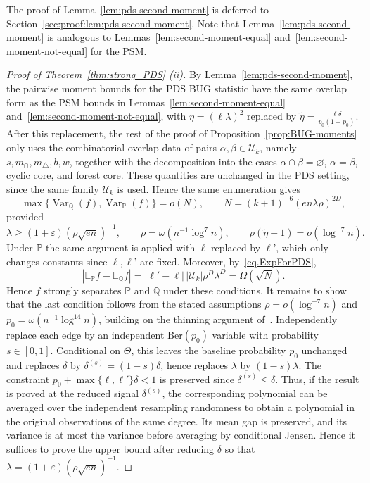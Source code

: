 \documentclass[11pt, letterpaper]{article}
\numberwithin{equation}{section}
\newcommand{\E}{\mathbb{E}}
\newcommand{\PP}{\mathbb{P}}
\newcommand{\QQ}{\mathbb{Q}}
\begin{document}
The proof of Lemma~\ref{lem:pds-second-moment} is deferred to Section~\ref{sec:proof:lem:pds-second-moment}.  Note that Lemma~\ref{lem:pds-second-moment} is analogous to Lemmas~\ref{lem:second-moment-equal} and~\ref{lem:second-moment-not-equal} for the PSM.

\begin{proof}[Proof of Theorem~\ref{thm:strong_PDS} \textnormal{(ii)}]
By Lemma~\ref{lem:pds-second-moment}, the pairwise moment bounds for the PDS BUG statistic have the same overlap form as the PSM bounds in Lemmas~\ref{lem:second-moment-equal} and~\ref{lem:second-moment-not-equal}, with $\eta=(\ell\lambda)^2$
replaced by $\tilde\eta=\frac{\ell\delta}{p_0(1-p_0)}.$ After this replacement, the rest of the proof of Proposition~\ref{prop:BUG-moments} only uses the combinatorial overlap data of pairs $\alpha,\beta\in\mathcal U_k$, namely $s,m_\cap,m_\triangle,b,w$, together with the decomposition into the cases $\alpha\cap\beta=\varnothing$, $\alpha=\beta$, cyclic core, and forest core. These quantities are unchanged in the PDS setting, since the same family $\mathcal U_k$ is used. Hence the same enumeration gives
\[
\max\{\operatorname{Var}_{\QQ}(f),\operatorname{Var}_{\PP}(f)\}=o(N),
\qquad
N=(k+1)^{-6}(en\lambda\rho)^{2D},
\]
provided
\[
\lambda \geq (1+\varepsilon)(\rho\sqrt{en})^{-1},\qquad
\rho=\omega(n^{-1}\log^7 n),\qquad
\rho(\tilde\eta+1)=o(\log^{-7}n).
\]
Under $\PP$ the same argument is applied with $\ell$ replaced by $\ell’$, which only changes constants since $\ell,\ell’$ are fixed. Moreover, by~\eqref{eq.ExpForPDS},
\[
|\E_\PP f-\E_\QQ f|=|\ell'-\ell|\,|\mathcal U_k|\rho^D\lambda^D=\Omega(\sqrt N).
\]
Hence $f$ strongly separates $\PP$ and $\QQ$ under these conditions. It remains to show that the last condition follows from the stated assumptions $\rho=o(\log^{-7}n)$ and $p_0=\omega(n^{-1}\log^{14}n)$, building on the thinning argument of~\cite[Proof of Theorem~2.4(b)]{sohn2025sharp}.  Independently replace each edge by an independent $\mathrm{Ber}(p_0)$ variable with probability $s\in[0,1]$. Conditional on $\Theta$, this leaves the baseline probability $p_0$ unchanged and replaces $\delta$ by $\delta^{(s)}=(1-s)\delta$, hence replaces $\lambda$ by $(1-s)\lambda$. The constraint $p_0+\max\{\ell,\ell'\}\delta<1$ is preserved since $\delta^{(s)}\le\delta$. Thus, if the result is proved at the reduced signal $\delta^{(s)}$, the corresponding polynomial can be averaged over the independent resampling randomness to obtain a polynomial in the original observations of the same degree. Its mean gap is preserved, and its variance is at most the variance before averaging by conditional Jensen. Hence it suffices to prove the upper bound after reducing $\delta$ so that $\lambda=(1+\varepsilon)(\rho\sqrt{en})^{-1}.$




\end{proof}
\end{document}
